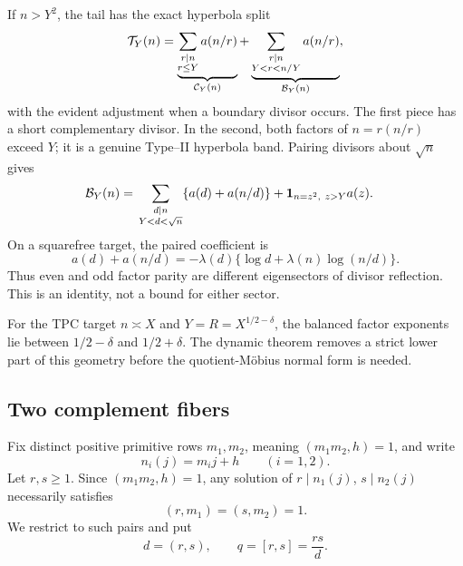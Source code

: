 If \(n>Y^2\), the tail has the exact hyperbola split
\begin{equation}
 \mathcal T_Y(n)
 =\underbrace{\sum_{\substack{r\mid n\\r\le Y}}a(n/r)}_{\mathcal C_Y(n)}
 +\underbrace{\sum_{\substack{r\mid n\\Y<r<n/Y}}a(n/r)}_{\mathcal B_Y(n)},
 \label{eq:balanced-split}
\end{equation}
with the evident adjustment when a boundary divisor occurs.  The first
piece has a short complementary divisor.  In the second, both factors
of \(n=r(n/r)\) exceed \(Y\); it is a genuine Type--II hyperbola band.
Pairing divisors about \(\sqrt n\) gives
\begin{align}
 \mathcal B_Y(n)
 ={}&\sum_{\substack{d\mid n\\Y<d<\sqrt n}}
 \{a(d)+a(n/d)\}
 +\mathbf 1_{n=z^2,\ z>Y}a(z).
 \label{eq:folded-balanced-band}
\end{align}
On a squarefree target, the paired coefficient is
\begin{equation}
 a(d)+a(n/d)
 =-\lambda(d)\{\log d+\lambda(n)\log(n/d)\}.
 \label{eq:squarefree-parity-pair}
\end{equation}
Thus even and odd factor parity are different eigensectors of divisor
reflection.  This is an identity, not a bound for either sector.

For the TPC target \(n\asymp X\) and
\(Y=R=X^{1/2-\delta}\), the balanced factor exponents lie between
\(1/2-\delta\) and \(1/2+\delta\).  The dynamic theorem removes a
strict lower part of this geometry before the quotient-M\"obius
normal form is needed.

\subsection{Two complement fibers}

Fix distinct positive primitive rows \(m_1,m_2\), meaning
\((m_1m_2,h)=1\), and write
\begin{equation}
 n_i(j)=m_i j+h\qquad(i=1,2).
 \label{eq:two-targets}
\end{equation}
Let \(r,s\ge1\).  Since \((m_1m_2,h)=1\), any solution of
\(r\mid n_1(j)\), \(s\mid n_2(j)\) necessarily satisfies
\begin{equation}
 (r,m_1)=(s,m_2)=1.
 \label{eq:complement-primitivity}
\end{equation}
We restrict to such pairs and put
\begin{equation}
 d=(r,s),\qquad q=[r,s]=\frac{rs}{d}.
 \label{eq:rsdq}
\end{equation}

